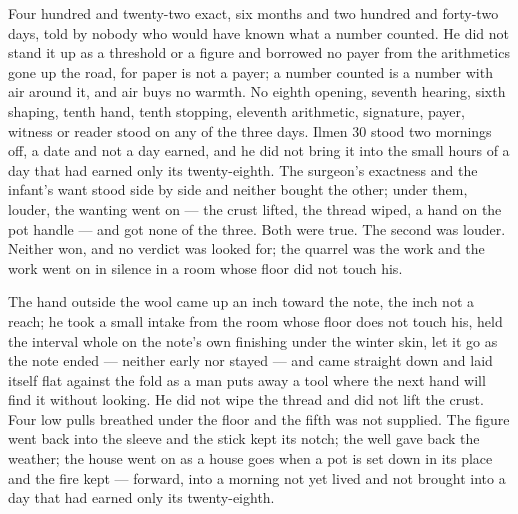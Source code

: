 Four hundred and twenty-two exact, six months and two hundred and forty-two days, told by nobody who would have known what a number counted. He did not stand it up as a threshold or a figure and borrowed no payer from the arithmetics gone up the road, for paper is not a payer; a number counted is a number with air around it, and air buys no warmth. No eighth opening, seventh hearing, sixth shaping, tenth hand, tenth stopping, eleventh arithmetic, signature, payer, witness or reader stood on any of the three days. Ilmen 30 stood two mornings off, a date and not a day earned, and he did not bring it into the small hours of a day that had earned only its twenty-eighth. The surgeon's exactness and the infant's want stood side by side and neither bought the other; under them, louder, the wanting went on --- the crust lifted, the thread wiped, a hand on the pot handle --- and got none of the three. Both were true. The second was louder. Neither won, and no verdict was looked for; the quarrel was the work and the work went on in silence in a room whose floor did not touch his.

The hand outside the wool came up an inch toward the note, the inch not a reach; he took a small intake from the room whose floor does not touch his, held the interval whole on the note's own finishing under the winter skin, let it go as the note ended --- neither early nor stayed --- and came straight down and laid itself flat against the fold as a man puts away a tool where the next hand will find it without looking. He did not wipe the thread and did not lift the crust. Four low pulls breathed under the floor and the fifth was not supplied. The figure went back into the sleeve and the stick kept its notch; the well gave back the weather; the house went on as a house goes when a pot is set down in its place and the fire kept --- forward, into a morning not yet lived and not brought into a day that had earned only its twenty-eighth.
